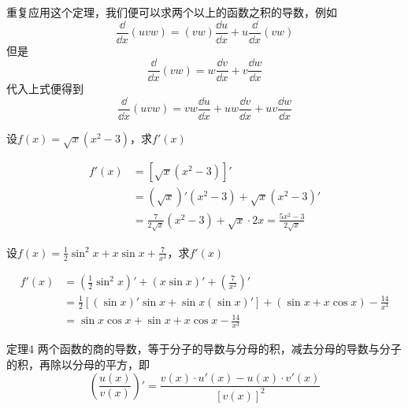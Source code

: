 重复应用这个定理，我们便可以求两个以上的函数之积的导数，例如
\[\frac{\dd }{\dd x}(uvw)=(vw)\frac{\dd u}{\dd x}+u\frac{\dd }{\dd x}(vw)\]
但是
\[\frac{\dd }{\dd x}(vw)=w\frac{\dd v}{\dd x}+v\frac{\dd w}{\dd x}\]
代入上式便得到
\[\frac{\dd }{\dd x}(uvw)=vw\frac{\dd u}{\dd x}+uw\frac{\dd v}{\dd x}+uv\frac{\dd w}{\dd x}\]


\begin{example}
    设$f(x)=\sqrt{x}(x^2-3)$，求$f'(x)$
\end{example}


\begin{solution}
    \[\begin{split}
f'(x)&=\left[\sqrt{x}(x^2-3)\right]'\\
&=\left(\sqrt{x}\right)'(x^2-3)+\sqrt{x}(x^2-3)'\\
&=\frac{7}{2\sqrt{x}}(x^2-3)+\sqrt{x}\cdot 2x = \frac{5x^2-3}{2\sqrt{x}}
    \end{split}\]
\end{solution}

\begin{example}
    设$f(x)=\frac{1}{2}\sin^2 x+x\sin x+\frac{7}{x^2}$，求$f'(x)$
\end{example}

\begin{solution}
\[\begin{split}
    f'(x)&=\left(\frac{1}{2}\sin^2 x\right)'+(x\sin x)'+\left(\frac{7}{x^2}\right)'\\
    &=\frac{1}{2}\left[(\sin x)'\sin x+\sin x(\sin x)'\right]+(\sin x+x\cos x)-\frac{14}{x^3}\\
    &=\sin x\cos x+\sin x+x\cos x-\frac{14}{x^3}
\end{split}\]
\end{solution}

\begin{blk}
    {定理4} 两个函数的商的导数，等于分子的导数与分母的积，减去分母的导数与分子的积，再除以分母的平方，即
\[\left(\frac{u(x)}{v(x)}\right)'=\frac{v(x)\cdot u'(x)-u(x)\cdot v'(x)}{[v(x)]^2}\]
\end{blk}

